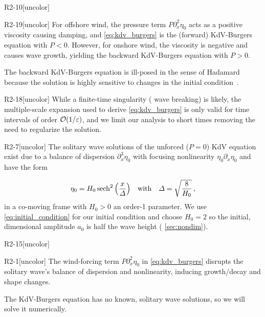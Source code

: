 \documentclass{jfm}
\renewcommand*{\epsilon}{\varepsilon}
\begin{document}
\begin{LineLabel}{R2-10}[uncolor]
\begin{LineLabel}{R2-19}[uncolor]
For offshore wind, the pressure term $P \partial^2_x \eta_0$ acts as a
positive viscosity causing damping, and \cref{eq:kdv_burgers} is the
(forward) KdV-Burgers equation with $P<0$.
However, for onshore wind, the viscosity is negative and causes wave
growth, yielding the backward KdV-Burgers equation with $P>0$.
\end{LineLabel}
The backward KdV-Burgers equation is ill-posed in the sense of Hadamard
because the solution is highly sensitive to changes in the initial
condition~\citep{hadamard1902problemes}.
\begin{LineLabel}{R2-18}[uncolor]
While a finite-time singularity (\ie{} wave breaking) is likely, the
multiple-scale expansion used to derive \cref{eq:kdv_burgers} is only
valid for time intervals of order $\order{1/\epsilon}$, and we limit our
analysis to short times removing the need to regularize the solution.
\end{LineLabel}
\end{LineLabel}

\begin{LineLabel}{R2-7}[uncolor]
The solitary wave solutions of the unforced ($P=0$) KdV equation exist
due to a balance of dispersion $\partial_x^3 \eta_0$ with focusing
nonlinearity $\eta_0 \partial_x \eta_0$ and have the
form~\citep[\eg][]{mei2005nonlinear}
\end{LineLabel}
\begin{equation}
  \eta_0 = H_0 \sech^2\pqty{\frac{x}{\Delta}}
  \qq{with}
  \Delta = \sqrt{\frac{8}{H_0}} \,,
  \label{eq:initial_condition}
\end{equation}
in a co-moving frame with $H_0>0$ an order-1 parameter.
We use \cref{eq:initial_condition} for our initial condition and choose
$H_0 = 2$ so the initial, dimensional amplitude $a_0$ is half the wave
height (\cf{} \cref{sec:nondim}).
\begin{LineLabel}{R2-15}[uncolor]
\begin{LineLabel}{R2-1}[uncolor]
The wind-forcing term $P \partial_x^2 \eta_0$ in \cref{eq:kdv_burgers}
disrupts the solitary wave's balance of dispersion and nonlinearity,
inducing growth/decay and shape changes.
\end{LineLabel}
\end{LineLabel}
The KdV-Burgers equation has no known, solitary wave solutions, so we
will solve it numerically.
\end{document}

